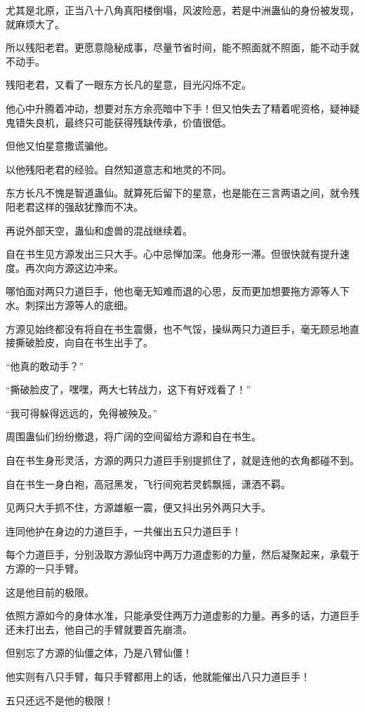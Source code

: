 \begin{this_body}
尤其是北原，正当八十八角真阳楼倒塌，风波险恶，若是中洲蛊仙的身份被发现，就麻烦大了。

所以残阳老君。更愿意隐秘成事，尽量节省时间，能不照面就不照面，能不动手就不动手。

残阳老君，又看了一眼东方长凡的星意，目光闪烁不定。

他心中升腾着冲动，想要对东方余亮暗中下手！但又怕失去了精着呢资格，疑神疑鬼错失良机，最终只可能获得残缺传承，价值很低。

但他又怕星意撒谎骗他。

以他残阳老君的经验。自然知道意志和地灵的不同。

东方长凡不愧是智道蛊仙。就算死后留下的星意，也是能在三言两语之间，就令残阳老君这样的强敌犹豫而不决。

再说外部天空，蛊仙和虚兽的混战继续着。

自在书生见方源发出三只大手。心中忌惮加深。他身形一滞。但很快就有提升速度。再次向方源这边冲来。

哪怕面对两只力道巨手，他也毫无知难而退的心思，反而更加想要拖方源等人下水。刺探出方源等人的底细。

方源见始终都没有将自在书生震慑，也不气馁，操纵两只力道巨手，毫无顾忌地直接撕破脸皮，向自在书生出手了。

“他真的敢动手？”

“撕破脸皮了，嘿嘿，两大七转战力，这下有好戏看了！”

“我可得躲得远远的，免得被殃及。”

周围蛊仙们纷纷撤退，将广阔的空间留给方源和自在书生。

自在书生身形灵活，方源的两只力道巨手别提抓住了，就是连他的衣角都碰不到。

自在书生一身白袍，高冠黑发，飞行间宛若灵鹤飘摇，潇洒不羁。

见两只大手抓不住，方源雄躯一震，便又抖出另外两只大手。

连同他护在身边的力道巨手，一共催出五只力道巨手！

每个力道巨手，分别汲取方源仙窍中两万力道虚影的力量，然后凝聚起来，承载于方源的一只手臂。

这是他目前的极限。

依照方源如今的身体水准，只能承受住两万力道虚影的力量。再多的话，力道巨手还未打出去，他自己的手臂就要首先崩溃。

但别忘了方源的仙僵之体，乃是八臂仙僵！

他实则有八只手臂，每只手臂都用上的话，他就能催出八只力道巨手！

五只还远不是他的极限！


\end{this_body}
